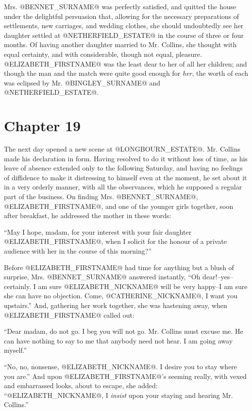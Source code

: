 Mrs. @BENNET_SURNAME@ was perfectly satisfied, and quitted the house under the
delightful persuasion that, allowing for the necessary preparations of
settlements, new carriages, and wedding clothes, she should undoubtedly
see her daughter settled at @NETHERFIELD_ESTATE@ in the course of three or four
months. Of having another daughter married to Mr. Collins, she thought
with equal certainty, and with considerable, though not equal, pleasure.
@ELIZABETH_FIRSTNAME@ was the least dear to her of all her children; and though the
man and the match were quite good enough for \textit{her}, the worth of each
was eclipsed by Mr. @BINGLEY_SURNAME@ and @NETHERFIELD_ESTATE@.



\chapter*{Chapter 19}


The next day opened a new scene at @LONGBOURN_ESTATE@. Mr. Collins made his
declaration in form. Having resolved to do it without loss of time, as
his leave of absence extended only to the following Saturday, and having
no feelings of diffidence to make it distressing to himself even at
the moment, he set about it in a very orderly manner, with all the
observances, which he supposed a regular part of the business. On
finding Mrs. @BENNET_SURNAME@, @ELIZABETH_FIRSTNAME@, and one of the younger girls together,
soon after breakfast, he addressed the mother in these words:

``May I hope, madam, for your interest with your fair daughter @ELIZABETH_FIRSTNAME@,
when I solicit for the honour of a private audience with her in the
course of this morning?''

Before @ELIZABETH_FIRSTNAME@ had time for anything but a blush of surprise, Mrs.
@BENNET_SURNAME@ answered instantly, ``Oh dear!--yes--certainly. I am sure @ELIZABETH_NICKNAME@
will be very happy--I am sure she can have no objection. Come, @CATHERINE_NICKNAME@, I
want you upstairs.'' And, gathering her work together, she was hastening
away, when @ELIZABETH_FIRSTNAME@ called out:

``Dear madam, do not go. I beg you will not go. Mr. Collins must excuse
me. He can have nothing to say to me that anybody need not hear. I am
going away myself.''

``No, no, nonsense, @ELIZABETH_NICKNAME@. I desire you to stay where you are.'' And upon
@ELIZABETH_FIRSTNAME@'s seeming really, with vexed and embarrassed looks, about to
escape, she added: ``@ELIZABETH_NICKNAME@, I \textit{insist} upon your staying and hearing Mr.
Collins.''

